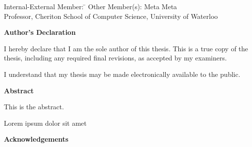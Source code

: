   \noindent
\begin{tabbing}
Internal-External Member: \=  \kill %
Other Member(s): \> Meta Meta \\
\> Professor, Cheriton School of Computer Science, University of Waterloo \\
\end{tabbing}

\cleardoublepage
{}    %

 \begin{center}\textbf{Author's Declaration}\end{center}

 \noindent
I hereby declare that I am the sole author of this thesis. This is a true copy of the thesis, including any required final revisions, as accepted by my examiners.
 \noindent  
  \bigskip
  
  \noindent
I understand that my thesis may be made electronically available to the public.

\cleardoublepage
{}    %

\begin{center}\textbf{Abstract}\end{center}

This is the abstract.

Lorem ipsum dolor sit amet


\cleardoublepage
{}    %

\begin{center}\textbf{Acknowledgements}\end{center}

